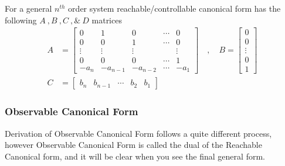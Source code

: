 \documentclass[twoside]{article}
\begin{document}
For a general $n^{th}$ order system reachable/controllable
canonical form has the following $A \ ,  B \ ,  C \ , \& \ D$
matrices
%
\begin{align*}
A &= \left[ \begin{array}{ccccc} 0 & 1 & 0 & \cdots & 0 \\ 0 & 0 & 1 &
                                                                      \cdots & 0
\\ \vdots & \vdots & \vdots & & \vdots
\\ 0 & 0 & 0 & \cdots & 1
    \\ -a_n & -a_{n-1} & -a_{n-2} & \cdots & -a_1 \end{array} \right]
\quad , \quad 
B = \left[ \begin{array}{c} 0\\ 0 \\ \vdots \\ 0
    \\ 1 \end{array} \right]
\\ C &= \left[ \begin{array}{ccccc} b_n 
  &  b_{n-1} & \cdots &  b_2 &
   b_1 \end{array} \right]
\end{align*}

\subsubsection*{Observable Canonical Form}

Derivation of Observable Canonical Form follows a quite
different process, however Observable Canonical Form is called the
dual of the Reachable Canonical form, and it will be clear when you 
see the final general form. 
\end{document}
